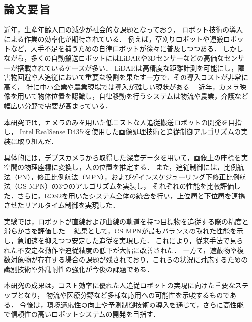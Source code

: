 \begin{center}
    \section*{論\,文\,要\,旨}                      %
\end{center}

近年，生産年齢人口の減少が社会的な課題となっており，
ロボット技術の導入による作業の効率化が期待されている．
例えば，草刈りロボットや運搬ロボットなど，人手不足を補うための自律ロボットが徐々に普及しつつある．
しかしながら，多くの自動搬送ロボットにはLiDARや3Dセンサーなどの高価なセンサーが搭載されているケースが多い．
LiDARは高精度な距離計測を可能にし，障害物回避や人追従において重要な役割を果たす一方で，その導入コストが非常に高く，
特に中小企業や農業現場では導入が難しい現状がある．
近年，カメラ映像を用いて物体位置を認識し，自律移動を行うシステムは物流や農業，介護など幅広い分野で需要が高まっている．

本研究では，カメラのみを用いた低コストな人追従搬送ロボットの開発を目指し，
Intel RealSense D435iを使用した画像処理技術と追従制御アルゴリズムの実装に取り組んだ．

具体的には，デプスカメラから取得した深度データを用いて，画像上の座標を実空間の物理座標に変換し，人の位置を推定する．
また，追従制御には，比例航法（PN），修正比例航法（MPN），およびゲインスケジューリング下修正比例航法（GS-MPN）の3つのアルゴリズムを実装し，
それぞれの性能を比較評価した．さらに，ROS2を用いたシステム全体の統合を行い，上位層と下位層を連携させたリアルタイム制御を実現した．

実験では，ロボットが直線および曲線の軌道を持つ目標物を追従する際の精度と滑らかさを評価した．
結果として，GS-MPNが最もバランスの取れた性能を示し，急加速を抑えつつ安定した追従を実現した．
これにより，従来手法で見られた不安定な動作や追従精度の低下が大幅に改善された．
一方で，遮蔽物や複数対象物が存在する場合の課題が残されており，これらの状況に対応するための識別技術や外乱耐性の強化が今後の課題である．

本研究の成果は，コスト効率に優れた人追従ロボットの実現に向けた重要なステップとなり，
物流や医療分野など多様な応用への可能性を示唆するものである．
今後は，環境適応性の向上や予測制御技術の導入を通じて，さらに高性能で信頼性の高いロボットシステムの開発を目指す．